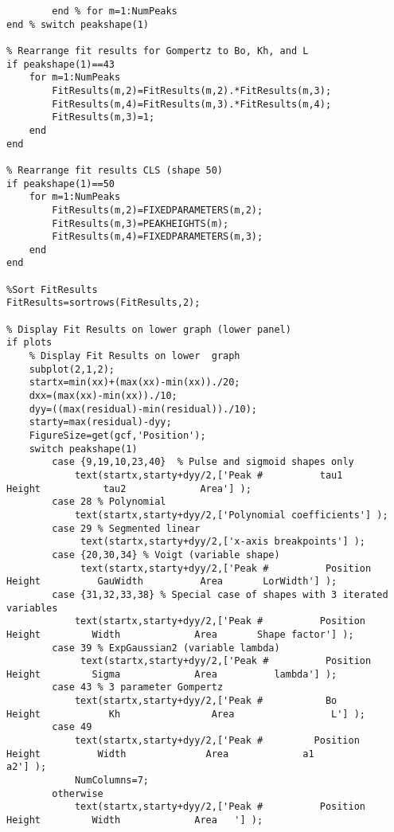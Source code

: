 \begin{lstlisting}
        end % for m=1:NumPeaks
end % switch peakshape(1)
  
% Rearrange fit results for Gompertz to Bo, Kh, and L
if peakshape(1)==43
    for m=1:NumPeaks
        FitResults(m,2)=FitResults(m,2).*FitResults(m,3);
        FitResults(m,4)=FitResults(m,3).*FitResults(m,4);
        FitResults(m,3)=1;
    end
end

% Rearrange fit results CLS (shape 50)
if peakshape(1)==50
    for m=1:NumPeaks
        FitResults(m,2)=FIXEDPARAMETERS(m,2);
        FitResults(m,3)=PEAKHEIGHTS(m);
        FitResults(m,4)=FIXEDPARAMETERS(m,3);
    end
end

%Sort FitResults
FitResults=sortrows(FitResults,2);

% Display Fit Results on lower graph (lower panel)
if plots
    % Display Fit Results on lower  graph
    subplot(2,1,2);
    startx=min(xx)+(max(xx)-min(xx))./20;
    dxx=(max(xx)-min(xx))./10;
    dyy=((max(residual)-min(residual))./10);
    starty=max(residual)-dyy;
    FigureSize=get(gcf,'Position');
    switch peakshape(1)
        case {9,19,10,23,40}  % Pulse and sigmoid shapes only
            text(startx,starty+dyy/2,['Peak #          tau1           Height           tau2             Area'] );
        case 28 % Polynomial
            text(startx,starty+dyy/2,['Polynomial coefficients'] );
        case 29 % Segmented linear
             text(startx,starty+dyy/2,['x-axis breakpoints'] );
        case {20,30,34} % Voigt (variable shape)
             text(startx,starty+dyy/2,['Peak #          Position        Height          GauWidth          Area       LorWidth'] );                       
        case {31,32,33,38} % Special case of shapes with 3 iterated variables
            text(startx,starty+dyy/2,['Peak #          Position        Height         Width             Area       Shape factor'] );            
        case 39 % ExpGaussian2 (variable lambda)
             text(startx,starty+dyy/2,['Peak #          Position        Height         Sigma             Area          lambda'] );                       
        case 43 % 3 parameter Gompertz
            text(startx,starty+dyy/2,['Peak #           Bo             Height            Kh                Area                 L'] );            
        case 49
            text(startx,starty+dyy/2,['Peak #         Position        Height          Width              Area             a1              a2'] );            
            NumColumns=7;
        otherwise
            text(startx,starty+dyy/2,['Peak #          Position         Height         Width             Area   '] );

\end{lstlisting}
